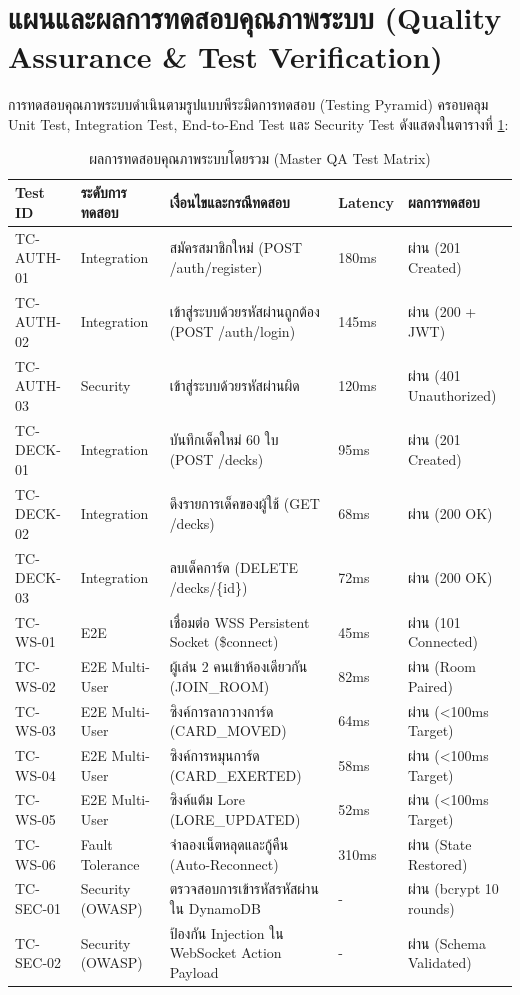 \documentclass[12pt,a4paper]{report}
\begin{document}
\section{แผนและผลการทดสอบคุณภาพระบบ (Quality Assurance \& Test Verification)}
การทดสอบคุณภาพระบบดำเนินตามรูปแบบพีระมิดการทดสอบ (Testing Pyramid) ครอบคลุม Unit Test, Integration Test, End-to-End Test และ Security Test ดังแสดงในตารางที่ \ref{tab:qa_results}:

\begin{table}[H]
\centering
\caption{ผลการทดสอบคุณภาพระบบโดยรวม (Master QA Test Matrix)}
\label{tab:qa_results}
\small
\begin{tabularx}{\textwidth}{p{1.4cm}p{2.2cm}Xp{1.5cm}p{1.5cm}}
\toprule
\textbf{Test ID} & \textbf{ระดับการทดสอบ} & \textbf{เงื่อนไขและกรณีทดสอบ} & \textbf{Latency} & \textbf{ผลการทดสอบ} \\
\midrule
TC-AUTH-01 & Integration & สมัครสมาชิกใหม่ (POST /auth/register) & 180ms & ผ่าน (201 Created) \\
TC-AUTH-02 & Integration & เข้าสู่ระบบด้วยรหัสผ่านถูกต้อง (POST /auth/login) & 145ms & ผ่าน (200 + JWT) \\
TC-AUTH-03 & Security & เข้าสู่ระบบด้วยรหัสผ่านผิด & 120ms & ผ่าน (401 Unauthorized) \\
TC-DECK-01 & Integration & บันทึกเด็คใหม่ 60 ใบ (POST /decks) & 95ms & ผ่าน (201 Created) \\
TC-DECK-02 & Integration & ดึงรายการเด็คของผู้ใช้ (GET /decks) & 68ms & ผ่าน (200 OK) \\
TC-DECK-03 & Integration & ลบเด็คการ์ด (DELETE /decks/\{id\}) & 72ms & ผ่าน (200 OK) \\
TC-WS-01 & E2E & เชื่อมต่อ WSS Persistent Socket (\$connect) & 45ms & ผ่าน (101 Connected) \\
TC-WS-02 & E2E Multi-User & ผู้เล่น 2 คนเข้าห้องเดียวกัน (JOIN\_ROOM) & 82ms & ผ่าน (Room Paired) \\
TC-WS-03 & E2E Multi-User & ซิงค์การลากวางการ์ด (CARD\_MOVED) & 64ms & ผ่าน (<100ms Target) \\
TC-WS-04 & E2E Multi-User & ซิงค์การหมุนการ์ด (CARD\_EXERTED) & 58ms & ผ่าน (<100ms Target) \\
TC-WS-05 & E2E Multi-User & ซิงค์แต้ม Lore (LORE\_UPDATED) & 52ms & ผ่าน (<100ms Target) \\
TC-WS-06 & Fault Tolerance & จำลองเน็ตหลุดและกู้คืน (Auto-Reconnect) & 310ms & ผ่าน (State Restored) \\
TC-SEC-01 & Security (OWASP) & ตรวจสอบการเข้ารหัสรหัสผ่านใน DynamoDB & - & ผ่าน (bcrypt 10 rounds) \\
TC-SEC-02 & Security (OWASP) & ป้องกัน Injection ใน WebSocket Action Payload & - & ผ่าน (Schema Validated) \\
\bottomrule
\end{tabularx}
\end{table}
\end{document}
